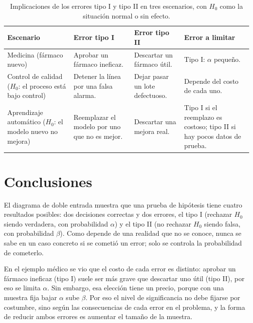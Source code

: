\documentclass[11pt,letterpaper]{article}
\begin{document}
\begin{table}[htbp]
\centering
\caption{Implicaciones de los errores tipo I y tipo II en tres escenarios, con $H_0$ como la situación normal o sin efecto.}
\label{tab:escenarios}
\small
\renewcommand{\arraystretch}{1.4}
\begin{tabular}{p{2.7cm}p{4.3cm}p{4.3cm}p{3.2cm}}
\hline
\textbf{Escenario} & \textbf{Error tipo I} & \textbf{Error tipo II} & \textbf{Error a limitar} \\
\hline
Medicina (fármaco nuevo) & Aprobar un fármaco ineficaz. & Descartar un fármaco útil. & Tipo I: $\alpha$ pequeño. \\
Control de calidad ($H_0$: el proceso está bajo control) & Detener la línea por una falsa alarma. & Dejar pasar un lote defectuoso. & Depende del costo de cada uno. \\
Aprendizaje automático ($H_0$: el modelo nuevo no mejora) & Reemplazar el modelo por uno que no es mejor. & Descartar una mejora real. & Tipo I si el reemplazo es costoso; tipo II si hay pocos datos de prueba. \\
\hline
\end{tabular}
\end{table}

\section{Conclusiones}

El diagrama de doble entrada muestra que una prueba de hipótesis tiene cuatro resultados posibles: dos decisiones correctas y dos errores, el tipo I (rechazar $H_0$ siendo verdadera, con probabilidad $\alpha$) y el tipo II (no rechazar $H_0$ siendo falsa, con probabilidad $\beta$). Como depende de una realidad que no se conoce, nunca se sabe en un caso concreto si se cometió un error; solo se controla la probabilidad de cometerlo.

En el ejemplo médico se vio que el costo de cada error es distinto: aprobar un fármaco ineficaz (tipo I) suele ser más grave que descartar uno útil (tipo II), por eso se limita $\alpha$. Sin embargo, esa elección tiene un precio, porque con una muestra fija bajar $\alpha$ sube $\beta$. Por eso el nivel de significancia no debe fijarse por costumbre, sino según las consecuencias de cada error en el problema, y la forma de reducir ambos errores es aumentar el tamaño de la muestra.

\end{document}
